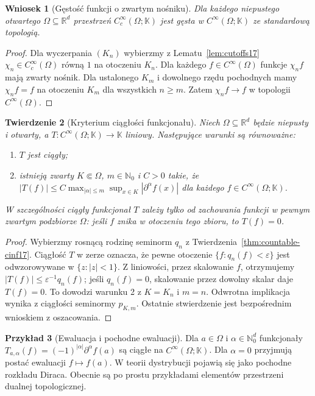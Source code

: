 \documentclass[11pt,a4paper]{article}
\numberwithin{equation}{section}
\theoremstyle{plain}
\newtheorem{twierdzenie}{Twierdzenie}[section]
\newtheorem{wniosek}[twierdzenie]{Wniosek}
\theoremstyle{definition}
\newtheorem{przyklad}[twierdzenie]{Przykład}
\theoremstyle{remark}
\newcommand{\R}{\mathbb R}
\newcommand{\N}{\mathbb N}
\newcommand{\K}{\mathbb K}
\begin{document}
\begin{wniosek}[Gęstość funkcji o zwartym nośniku]
\label{cor:density-cinf17}
Dla każdego niepustego otwartego $\Omega\subseteq\R^d$
przestrzeń $C_c^\infty(\Omega;\K)$ jest gęsta w
$C^\infty(\Omega;\K)$ ze standardową topologią.
\end{wniosek}
\begin{proof}
Dla wyczerpania $(K_n)$ wybierzmy z Lematu~\ref{lem:cutoffs17}
$\chi_n\in C_c^\infty(\Omega)$ równą $1$ na otoczeniu $K_n$.
Dla każdego $f\in C^\infty(\Omega)$ funkcje $\chi_n f$
mają zwarty nośnik. Dla ustalonego $K_m$ i dowolnego
rzędu pochodnych mamy $\chi_n f=f$ na otoczeniu $K_m$
dla wszystkich $n\ge m$. Zatem $\chi_n f\to f$
w topologii $C^\infty(\Omega)$.
\end{proof}

\begin{twierdzenie}[Kryterium ciągłości funkcjonału]
\label{thm:dual-cinf17}
Niech $\Omega\subseteq\R^d$ będzie niepusty i otwarty,
a $T:C^\infty(\Omega;\K)\to\K$ liniowy.
Następujące warunki są równoważne:
\begin{enumerate}
\item $T$ jest ciągły;
\item istnieją zwarty $K\Subset\Omega$, $m\in\N_0$ i $C>0$ takie, że
$|T(f)|\le C\max_{|\alpha|\le m}\sup_{x\in K}|\partial^\alpha f(x)|$
dla każdego $f\in C^\infty(\Omega;\K)$.
\end{enumerate}
W szczególności ciągły funkcjonał $T$ zależy tylko od
zachowania funkcji w pewnym zwartym podzbiorze $\Omega$:
jeśli $f$ znika w otoczeniu tego zbioru, to $T(f)=0$.
\end{twierdzenie}
\begin{proof}
Wybierzmy rosnącą rodzinę seminorm $q_n$ z
Twierdzenia~\ref{thm:countable-cinf17}.
Ciągłość $T$ w zerze oznacza, że pewne otoczenie
$\{f:q_n(f)<\varepsilon\}$ jest odwzorowywane w
$\{z:|z|<1\}$. Z liniowości, przez skalowanie $f$,
otrzymujemy $|T(f)|\le\varepsilon^{-1}q_n(f)$;
jeśli $q_n(f)=0$, skalowanie przez dowolny skalar daje $T(f)=0$.
To dowodzi warunku 2 z $K=K_n$ i $m=n$.
Odwrotna implikacja wynika z ciągłości seminormy
$p_{K,m}$. Ostatnie stwierdzenie jest bezpośrednim
wnioskiem z oszacowania.
\end{proof}

\begin{przyklad}[Ewaluacja i pochodne ewaluacji]
\label{ex:evaluation-cinf17}
Dla $a\in\Omega$ i $\alpha\in\N_0^d$ funkcjonały
$T_{a,\alpha}(f)=(-1)^{|\alpha|}\partial^\alpha f(a)$
są ciągłe na $C^\infty(\Omega;\K)$. Dla $\alpha=0$
przyjmują postać ewaluacji $f\mapsto f(a)$.
W teorii dystrybucji pojawią się jako pochodne
rozkładu Diraca. Obecnie są po prostu przykładami
elementów przestrzeni dualnej topologicznej.
\end{przyklad}
\end{document}

